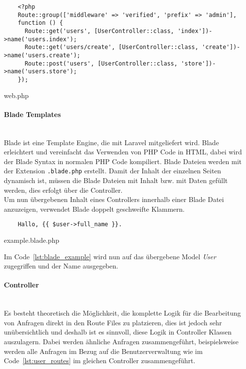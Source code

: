 \begin{listing}[H]
  \begin{verbatim}
    <?php
    Route::group(['middleware' => 'verified', 'prefix' => 'admin'], 
    function () {
      Route::get('users', [UserController::class, 'index'])->name('users.index');
      Route::get('users/create', [UserController::class, 'create'])->name('users.create');
      Route::post('users', [UserController::class, 'store'])->name('users.store');
    });
  \end{verbatim}
  \caption{web.php}
  \label{lst:user_routes}
\end{listing}

\paragraph{Blade Templates}\mbox{}\\
Blade ist eine Template Engine, die mit Laravel mitgeliefert wird. Blade
erleichtert und vereinfacht das Verwenden von PHP Code in HTML, dabei wird der
Blade Syntax in normalen PHP Code kompiliert. Blade Dateien werden mit der
Extension \verb|.blade.php| erstellt. Damit der Inhalt der einzelnen Seiten
dynamisch ist, müssen die Blade Dateien mit Inhalt bzw. mit Daten gefüllt werden, dies erfolgt über die Controller.\\

Um nun übergebenen Inhalt eines Controllers innerhalb einer Blade Datei anzuzeigen, verwendet Blade doppelt
geschweifte Klammern.

\begin{listing}[H]
  \begin{verbatim}
    Hallo, {{ $user->full_name }}.
  \end{verbatim}
  \caption{example.blade.php}
  \label{lst:blade_example}
\end{listing}

Im Code~\ref{lst:blade_example} wird nun auf das übergebene Model \textit{User}
zugegriffen und der Name ausgegeben.

\paragraph{Controller}\mbox{}\\
Es besteht theoretisch die Möglichkeit, die komplette Logik für die Bearbeitung
von Anfragen direkt in den Route Files zu platzieren, dies ist jedoch sehr
unübersichtlich und deshalb ist es sinnvoll, diese Logik in Controller Klassen
auszulagern. Dabei werden ähnliche Anfragen zusammengeführt, beispielsweise werden
alle Anfragen im Bezug auf die Benutzerverwaltung wie im Code~\ref{lst:user_routes} im gleichen Controller
zusammengeführt.

